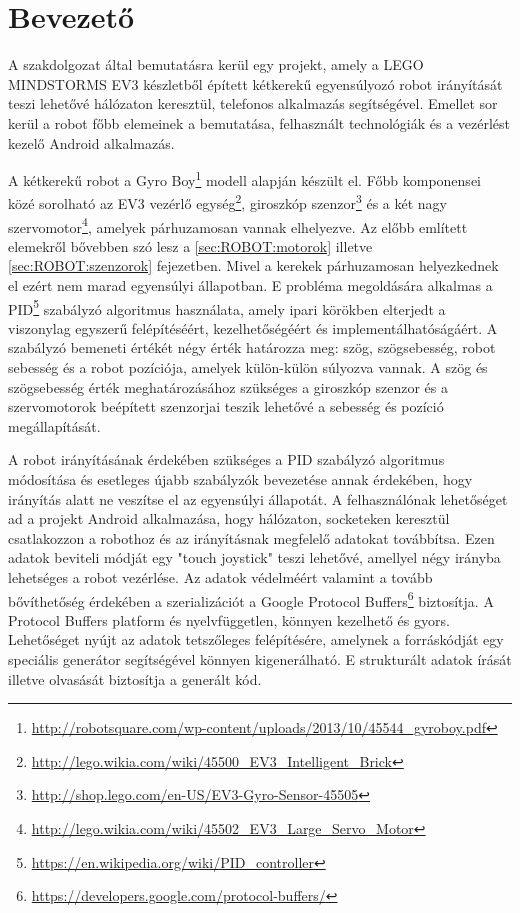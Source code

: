 \chapter{Bevezető}
A szakdolgozat által bemutatásra kerül egy projekt, amely a LEGO MINDSTORMS EV3\cite{mindstormsEv3} készletből épített kétkerekű egyensúlyozó robot irányítását teszi lehetővé hálózaton keresztül, telefonos alkalmazás segítségével. Emellet sor kerül a robot főbb elemeinek a bemutatása, felhasznált technológiák és a vezérlést kezelő Android alkalmazás.

A kétkerekű robot a Gyro Boy\footnote{\href{http://robotsquare.com/wp-content/uploads/2013/10/45544\_gyroboy.pdf}{http://robotsquare.com/wp-content/uploads/2013/10/45544\_gyroboy.pdf}} modell alapján készült el. Főbb komponensei közé sorolható az EV3 vezérlő egység\footnote{\href{http://lego.wikia.com/wiki/45500\_EV3\_Intelligent\_Brick}{http://lego.wikia.com/wiki/45500\_EV3\_Intelligent\_Brick}}, giroszkóp szenzor\footnote{\href{http://shop.lego.com/en-US/EV3-Gyro-Sensor-45505}{http://shop.lego.com/en-US/EV3-Gyro-Sensor-45505}} és a két nagy szervomotor\footnote{\href{http://lego.wikia.com/wiki/45502\_EV3\_Large\_Servo\_Motor}{http://lego.wikia.com/wiki/45502\_EV3\_Large\_Servo\_Motor}}, amelyek párhuzamosan vannak elhelyezve. Az előbb említett elemekről bővebben szó lesz a \ref{sec:ROBOT:motorok} illetve \ref{sec:ROBOT:szenzorok} fejezetben. Mivel a kerekek párhuzamosan helyezkednek el ezért nem marad egyensúlyi állapotban. E probléma megoldására alkalmas a PID\footnote{\href{https://en.wikipedia.org/wiki/PID\_controller}{https://en.wikipedia.org/wiki/PID\_controller}} szabályzó algoritmus használata, amely ipari körökben elterjedt a viszonylag egyszerű felépítéséért, kezelhetőségéért és implementálhatóságáért. A szabályzó bemeneti értékét négy érték határozza meg: szög, szögsebesség, robot sebesség és a robot pozíciója, amelyek külön-külön súlyozva vannak. A szög és szögsebesség érték meghatározásához szükséges a giroszkóp szenzor és a szervomotorok beépített szenzorjai teszik lehetővé a sebesség és pozíció megállapítását.

A robot irányításának érdekében szükséges a PID szabályzó algoritmus módosítása és esetleges újabb szabályzók bevezetése annak érdekében, hogy irányítás alatt ne veszítse el az egyensúlyi állapotát. A felhasználónak lehetőséget ad a projekt Android alkalmazása, hogy hálózaton, socketeken keresztül csatlakozzon a robothoz és az irányításnak megfelelő adatokat továbbítsa. Ezen adatok beviteli módját egy "touch joystick" teszi lehetővé, amellyel négy irányba lehetséges a robot vezérlése. Az adatok védelméért valamint a tovább bővíthetőség érdekében a szerializációt a Google Protocol Buffers\footnote{\href {https://developers.google.com/protocol-buffers/}{https://developers.google.com/protocol-buffers/}} biztosítja. A Protocol Buffers platform és nyelvfüggetlen, könnyen kezelhető és gyors. Lehetőséget nyújt az adatok tetszőleges felépítésére, amelynek a forráskódját egy speciális generátor segítségével könnyen kigenerálható. E strukturált adatok írását illetve olvasását biztosítja a generált kód.

